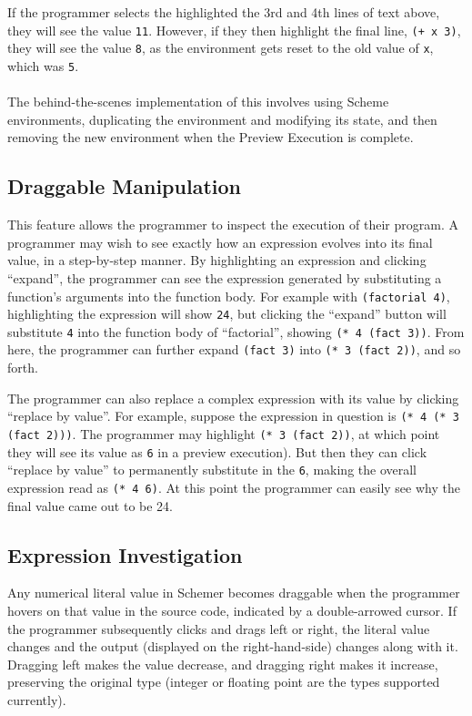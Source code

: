 \documentclass[10pt,journal,compsoc]{IEEEtran}
\begin{document}
        If the programmer selects the highlighted the 3rd and 4th lines of text above, they will see the value \lstinline{11}. However, if they then highlight the final line, \lstinline{(+ x 3)}, they will see the value \lstinline{8}, as the environment gets reset to the old value of \lstinline{x}, which was \lstinline{5}.\\
        \\
        The behind-the-scenes implementation of this involves using Scheme environments, duplicating the environment and modifying its state, and then removing the new environment when the Preview Execution is complete.

        \subsection{Draggable Manipulation}
        
        This feature allows the programmer to inspect the execution of their program. A programmer may wish to see exactly how an expression evolves into its final value, in a step-by-step manner. By highlighting an expression and clicking “expand”, the programmer can see the expression generated by substituting a function’s arguments into the function body. For example with \lstinline{(factorial 4)}, highlighting the expression will show \lstinline{24}, but clicking the “expand” button will substitute \lstinline{4} into the function body of “factorial”, showing \lstinline{(* 4 (fact 3))}. From here, the programmer can further expand \lstinline{(fact 3)} into \lstinline{(* 3 (fact 2))}, and so forth. 

The programmer can also replace a complex expression with its value by clicking “replace by value”. For example, suppose the expression in question is \lstinline{(* 4 (* 3 (fact 2)))}. The programmer may highlight \lstinline{(* 3 (fact 2))}, at which point they will see its value as \lstinline{6} in a preview execution). But then they can click “replace by value” to permanently substitute in the \lstinline{6}, making the overall expression read as \lstinline{(* 4 6)}. At this point the programmer can easily see why the final value came out to be 24. 

        \subsection{Expression Investigation}
        
        Any numerical literal value in Schemer becomes draggable when the programmer hovers on that value in the source code, indicated by a double-arrowed cursor. If the programmer subsequently clicks and drags left or right, the literal value changes and the output (displayed on the right-hand-side) changes along with it. Dragging left makes the value decrease, and dragging right makes it increase, preserving the original type (integer or floating point are the types supported currently). 
\end{document}
